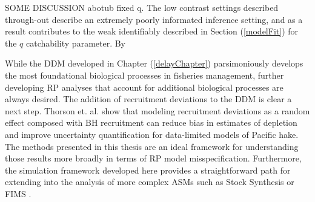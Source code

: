 \documentclass[12pt]{ucscthesis}
\begin{document}
{\color{red}
SOME DISCUSSION abotub fixed q.
%
The low contrast settings described through-out describe an extremely poorly 
informated inference setting, and as a result contributes to the weak identifiably 
described in Section (\ref{modelFit}) for the $q$ catchability parameter.
By 

}

%
While the DDM developed in Chapter (\ref{delayChapter}) parsimoniously develops 
the most foundational biological processes in fisheries management, further 
developing RP analyses that account for additional biological processes are 
always desired. The addition of recruitment deviations to the DDM is clear a next 
step. Thorson et. al. \cite{thorson_case_2019} show that modeling recruitment deviations
as a random effect composed with BH recruitment can reduce bias in estimates of depletion 
and improve uncertainty quantification for data-limited models of Pacific hake. %
The methods presented in this thesis are an ideal framework for understanding those 
results more broadly in terms of RP model misspecification. 
Furthermore, the simulation framework developed here provides a straightforward 
path for extending into the analysis of more complex ASMs such as Stock 
Synthesis \cite{methot_stock_2013} or FIMS \cite{stawitz_fisheries_2023}.



\end{document}
